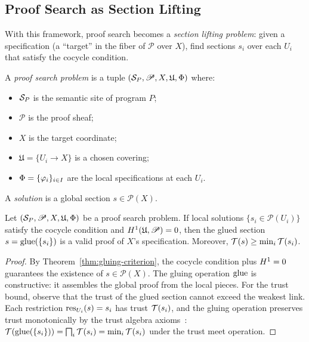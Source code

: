 \documentclass[11pt]{article}
\newcommand{\ProofSheaf}{\mathscr{P}}
\begin{document}
\subsection{Proof Search as Section Lifting}\label{subsec:lifting}

With this framework, proof search becomes a \emph{section lifting
problem}: given a specification (a ``target'' in the fiber of
$\ProofSheaf$ over $X$), find sections $s_i$ over each $U_i$ that
satisfy the cocycle condition.

\begin{definition}\label{def:search-problem}
A \emph{proof search problem} is a tuple
$(\Site_P, \ProofSheaf, X, \mathfrak{U}, \Phi)$ where:
\begin{itemize}
  \item $\mathcal{S}_P$ is the semantic site of program $P$;
  \item $\ProofSheaf$ is the proof sheaf;
  \item $X$ is the target coordinate;
  \item $\mathfrak{U} = \{U_i \to X\}$ is a chosen covering;
  \item $\Phi = \{\varphi_i\}_{i \in I}$ are the local specifications
    at each $U_i$.
\end{itemize}
A \emph{solution} is a global section $s \in \ProofSheaf(X)$.
\end{definition}

\begin{theorem}\label{thm:decomposition}
Let $(\Site_P, \ProofSheaf, X, \mathfrak{U}, \Phi)$ be a proof search
problem.  If local solutions $\{s_i \in \ProofSheaf(U_i)\}$ satisfy the
cocycle condition and $\Hcoh{1}(\mathfrak{U}, \ProofSheaf) = 0$, then
the glued section $s = \mathrm{glue}(\{s_i\})$ is a valid proof of $X$'s
specification.  Moreover, $\mathcal{T}(s) \geq \min_i \mathcal{T}(s_i)$.
\end{theorem}

\begin{proof}
By Theorem~\ref{thm:gluing-criterion}, the cocycle condition plus
$H^{1} = 0$ guarantees the existence of $s \in \ProofSheaf(X)$.
The gluing operation $\mathrm{glue}$ is constructive: it assembles the global
proof from the local pieces.  For the trust bound, observe that the
trust of the glued section cannot exceed the weakest link.  Each
restriction $\mathrm{res}_{U_i}(s) = s_i$ has trust $\mathcal{T}(s_i)$, and the
gluing operation preserves trust monotonically by the trust algebra
axioms~\cite{JuGeo2024-trust}: $\mathcal{T}(\mathrm{glue}(\{s_i\})) =
\bigsqcap_i \mathcal{T}(s_i) = \min_i \mathcal{T}(s_i)$ under the trust
meet operation.
\end{proof}
\end{document}
